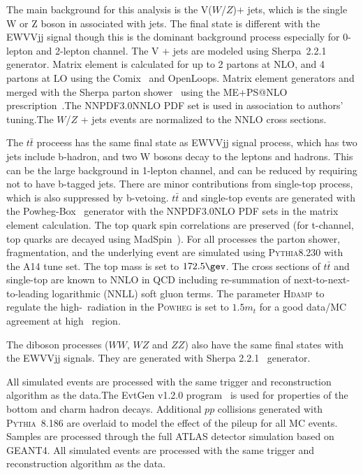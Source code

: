 The main background for this analysis is the V($W$/$Z$)$\plus$ jets, which is the single W or Z boson in associated with jets. The final state is different with the EWVVjj signal though this is the dominant background process especially for 0-lepton and 2-lepton channel.
The V $\plus$ jets are modeled using Sherpa~2.2.1~\cite{Gleisberg:2008ta} generator. 
Matrix element is calculated for up to 2 partons at NLO, and 4 partons at LO using the Comix~\cite{Gleisberg:2008fv} and OpenLoops\cite{Cascioli:2011va}. Matrix element generators and merged with the Sherpa parton shower~\cite{Schumann:2007mg} using the ME+PS@NLO prescription~\cite{Hoeche:2012yf}.The NNPDF3.0NNLO PDF set is used in association to authors' tuning.The $W$/$Z$ + jets events are normalized to the NNLO cross sections.

The $t\bar{t}$ proceess has the same final state as EWVVjj signal process, which has two jets include b-hadron, and two W bosons decay to the leptons and hadrons. This can be the large background in 1-lepton channel, and can be reduced by requiring not to have b-tagged jets. There are minor contributions from single-top process, which is also suppressed by b-vetoing.
$t\bar{t}$ and single-top events are generated with the Powheg-Box~\cite{Alioli:2010xd} generator with the NNPDF3.0NLO PDF\cite{Ball:2014uwa} sets in the matrix element calculation.
The top quark spin correlations are preserved (for t-channel, top quarks are decayed using MadSpin~\cite{Artoisenet:2012st}). For all processes the parton shower, fragmentation, and the underlying event are simulated using \textsc{Pythia}8.230 with the A14 tune set\cite{ATL-PHYS-PUB-2014-021}. The top mass is set to $172.5\gev$. The cross sections of $t\bar{t}$ and single-top are known to NNLO in QCD including re-summation of next-to-next-to-leading logarithmic (NNLL) soft gluon terms\cite{Czakon:2011xx,Kidonakis:2011wy,Kidonakis:2010tc,Kidonakis:2010ux}.
The parameter \textsc{Hdamp} to regulate the high-\pt\ radiation in the \textsc{Powheg} is set to $1.5m_{t}$ for a good data/MC agreement at high \pt\ region\cite{ATL-PHYS-PUB-2016-020}.

The diboson processes ($WW$, $WZ$ and $ZZ$) also have the same final states with the EWVVjj signals. They are generated with Sherpa 2.2.1~\cite{Gleisberg:2008ta} generator.

All simulated events are processed with the same trigger and reconstruction algorithm as the data.The EvtGen v1.2.0 program~\cite{Lange:2001uf} is used for properties of the bottom and charm hadron decays.
Additional $pp$ collisions generated with \textsc{Pythia}~8.186\cite{Sjostrand:2008vc} are overlaid to model the effect of the pileup for all MC events.
Samples are processed through the full ATLAS detector simulation\cite{SOFT-2010-01} based on \textsc{GEANT4}\cite{Agostinelli:2002hh}.
All simulated events are processed with the same trigger and reconstruction algorithm as the data.


